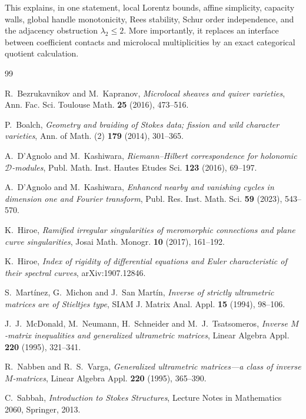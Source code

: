 \documentclass[11pt,a4paper]{amsart}
\theoremstyle{plain}
\theoremstyle{definition}
\begin{document}
This explains, in one statement, local Lorentz bounds, affine simplicity, capacity walls, global
handle monotonicity, Rees stability, Schur order independence, and the adjacency obstruction
$\lambda_2\leq2$.  More importantly, it replaces an interface between coefficient contacts and
microlocal multiplicities by an exact categorical quotient calculation.

\begin{thebibliography}{99}

R.~Bezrukavnikov and M.~Kapranov,
\emph{Microlocal sheaves and quiver varieties},
Ann. Fac. Sci. Toulouse Math. \textbf{25} (2016), 473--516.

P.~Boalch,
\emph{Geometry and braiding of Stokes data; fission and wild character varieties},
Ann. of Math. (2) \textbf{179} (2014), 301--365.

A.~D'Agnolo and M.~Kashiwara,
\emph{Riemann--Hilbert correspondence for holonomic $\mathcal D$-modules},
Publ. Math. Inst. Hautes Etudes Sci. \textbf{123} (2016), 69--197.

A.~D'Agnolo and M.~Kashiwara,
\emph{Enhanced nearby and vanishing cycles in dimension one and Fourier transform},
Publ. Res. Inst. Math. Sci. \textbf{59} (2023), 543--570.

K.~Hiroe,
\emph{Ramified irregular singularities of meromorphic connections and plane curve singularities},
Josai Math. Monogr. \textbf{10} (2017), 161--192.

K.~Hiroe,
\emph{Index of rigidity of differential equations and Euler characteristic of their spectral
curves}, arXiv:1907.12846.

S.~Mart\'{i}nez, G.~Michon and J.~San Mart\'{i}n,
\emph{Inverse of strictly ultrametric matrices are of Stieltjes type},
SIAM J. Matrix Anal. Appl. \textbf{15} (1994), 98--106.

J.~J.~McDonald, M.~Neumann, H.~Schneider and M.~J.~Tsatsomeros,
\emph{Inverse $M$-matrix inequalities and generalized ultrametric matrices},
Linear Algebra Appl. \textbf{220} (1995), 321--341.

R.~Nabben and R.~S.~Varga,
\emph{Generalized ultrametric matrices---a class of inverse $M$-matrices},
Linear Algebra Appl. \textbf{220} (1995), 365--390.

C.~Sabbah,
\emph{Introduction to Stokes Structures},
Lecture Notes in Mathematics 2060, Springer, 2013.

\end{thebibliography}
\end{document}
